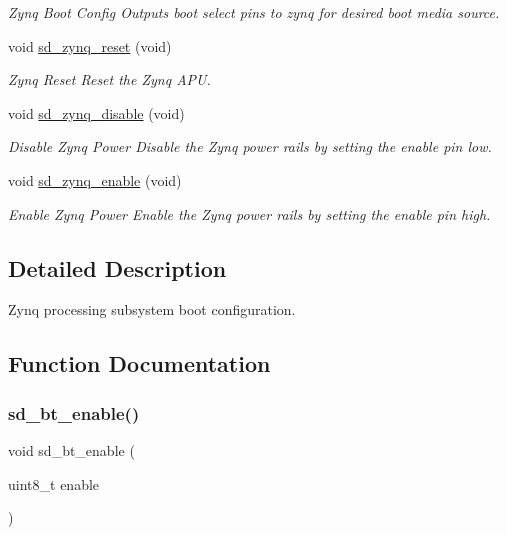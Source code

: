 \begin{DoxyCompactItemize}
\begin{DoxyCompactList}\small\item\em Zynq Boot Config Outputs boot select pins to zynq for desired boot media source. \end{DoxyCompactList}\item 
void \mbox{\hyperlink{group___s_d___platform___boot___config_ga65b13e7293170788758e4f8cd8512326}{sd\+\_\+zynq\+\_\+reset}} (void)
\begin{DoxyCompactList}\small\item\em Zynq Reset Reset the Zynq A\+PU. \end{DoxyCompactList}\item 
void \mbox{\hyperlink{group___s_d___platform___boot___config_gaaaa432cbbf3382d321107a38a56b9bef}{sd\+\_\+zynq\+\_\+disable}} (void)
\begin{DoxyCompactList}\small\item\em Disable Zynq Power Disable the Zynq power rails by setting the enable pin low. \end{DoxyCompactList}\item 
void \mbox{\hyperlink{group___s_d___platform___boot___config_gac30b9aa0032a9a8598735242c7cfa5bc}{sd\+\_\+zynq\+\_\+enable}} (void)
\begin{DoxyCompactList}\small\item\em Enable Zynq Power Enable the Zynq power rails by setting the enable pin high. \end{DoxyCompactList}\end{DoxyCompactItemize}


\subsection{Detailed Description}
Zynq processing subsystem boot configuration. 



\subsection{Function Documentation}
\mbox{\label{group___s_d___platform___boot___config_ga0f06bff92025356b589e3cfdae8ddcb7}} 
\subsubsection{\texorpdfstring{sd\+\_\+bt\+\_\+enable()}{sd\_bt\_enable()}}
{\footnotesize\ttfamily void sd\+\_\+bt\+\_\+enable (\begin{DoxyParamCaption}\item[{uint8\+\_\+t}]{enable }\end{DoxyParamCaption})}




